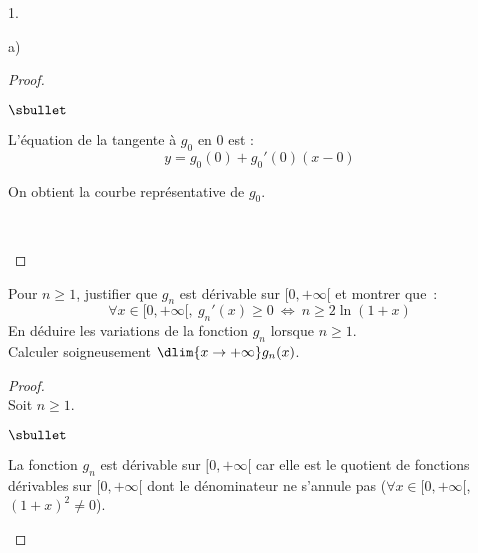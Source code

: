 \documentclass[11pt]{article}%
\begin{document}
\begin{noliste}{1.}
\begin{noliste}{a)}
\begin{proof}
\begin{noliste}{$\sbullet$}
   \item L'équation de la tangente à $g_0$ en $0$ est :
     \[
     y = g_0(0) + g_0'(0)(x-0)
     \]
  
  \item On obtient la courbe représentative de $g_0$.
  
  \begin{center}
    \shorthandoff{;}
    \end{center}~\\[-1.4cm]
 \end{noliste}
\end{proof}



\newpage



\item Pour $n \geq 1$, justifier que $g_n$ est dérivable sur
  $[0,+\infty[$ et montrer que~:
  \[ 
  \forall x \in [0,+\infty[, \ g_n'(x) \geq 0 \ \Leftrightarrow \ n
  \geq 2\ln(1+x)
  \]
  En déduire les variations de la fonction $g_n$ lorsque $n \geq 1$.\\ 
  Calculer soigneusement $\dlim{x \to + \infty} g_n(x)$.
  
  \begin{proof}~\\
    Soit $n\geq 1$.
    \begin{noliste}{$\sbullet$}
    \item La fonction $g_n$ est dérivable sur $[0,+\infty[$ car elle
      est le quotient de fonctions dérivables sur $[0,+\infty[$ dont
      le dénominateur ne s'annule pas ($\forall x \in [0,+\infty[$,
      $(1+x)^2 \neq 0$).
      

\end{noliste}
\end{proof}
\end{noliste}
\end{noliste}
\end{document}
